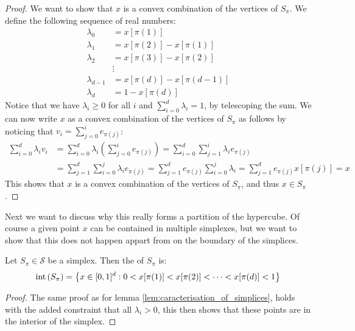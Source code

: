 \begin{proof}
    We want to show that $x$ is a convex combination of the vertices of $S_{\pi}$. We define the following sequence of real numbers:
    \begin{align*}
        \lambda_0     & = x[\pi(1)]               \\
        \lambda_1     & = x[\pi(2)] - x[\pi(1)]   \\
        \lambda_2     & = x[\pi(3)] - x[\pi(2)]   \\
                      & \vdots                    \\
        \lambda_{d-1} & = x[\pi(d)] - x[\pi(d-1)] \\
        \lambda_d     & = 1 - x[\pi(d)]
    \end{align*}
    Notice that we have $\lambda_i \geq 0$ for all $i$ and $\sum_{i=0}^{d} \lambda_i = 1$, by telescoping the sum. We can now write $x$ as a convex combination of the vertices of $S_{\pi}$ as follows by noticing that $v_i = \sum_{j=0}^{i} e_{\pi(j)}$:
    \begin{align*}
        \sum_{i=0}^{d} \lambda_i v_i & = \sum_{i=0}^{d} \lambda_i \left( \sum_{j=0}^{i} e_{\pi(j)} \right)  = \sum_{i=0}^{d} \sum_{j=1}^{i} \lambda_i e_{\pi(j)}                                \\
                                     & = \sum_{j=1}^{d} \sum_{i=0}^{j} \lambda_i e_{\pi(j)}  = \sum_{j=1}^{d} e_{\pi(j)} \sum_{i=0}^{j} \lambda_i		 = \sum_{j=1}^{d} e_{\pi(j)} x[\pi(j)]		     = x
    \end{align*}
    This shows that $x$ is a convex combination of the vertices of $S_{\pi}$, and thus $x \in S_{\pi}$.
\end{proof}
Next we want to discuss why this really forms a partition of the hypercube. Of course a given point $x$ can be contained in multiple simplexes, but we want to show that this does not happen appart from on the boundary of the simplices.
\begin{lemma}
    Let $S_{\pi} \in \mathcal{S}$ be a simplex. Then the  of $S_{\pi}$ is:
    \begin{align*}
        \text{int}\left(S_{\pi}\right) = \left\{x \in [0, 1]^d : 0 < x[\pi(1)] < x[\pi(2)] < \dots < x[\pi(d)] < 1\right\}
    \end{align*}
\end{lemma}
\begin{proof}
    The same proof as for lemma \ref{lem:caracterisation_of_simplices}, holds with the added constraint that all $\lambda_i > 0$, this then shows that these points are in the interior of the simplex.
\end{proof}
